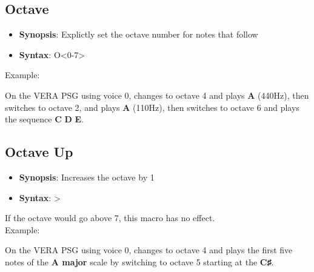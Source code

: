 \subsection{Octave}

\begin{itemize}

	\item {\bfseries Synopsis}: Explictly set the octave number for notes that follow

	\item {\bfseries Syntax}: {\ttfamily O<0-7>}

\end{itemize}

\vspace{16pt}

Example:\\


On the VERA PSG using voice 0, changes to octave 4 and plays
{\ttfamily\bfseries A} (440Hz), then switches to octave 2, and plays
{\ttfamily\bfseries A} (110Hz), then switches to octave 6 and plays the
sequence {\ttfamily\bfseries C} {\ttfamily\bfseries D} {\ttfamily\bfseries
E}.\\

\subsection{Octave Up}

\begin{itemize}

	\item {\bfseries Synopsis}: Increases the octave by 1

	\item {\bfseries Syntax}: {\ttfamily >}

\end{itemize}

\vspace{16pt}

If the octave would go above 7, this macro has no effect.\\

Example:\\


On the VERA PSG using voice 0, changes to octave 4 and plays the first five
notes of the {\ttfamily\bfseries A major} scale by switching to octave 5
starting at the {\ttfamily\bfseries C♯}.\\

